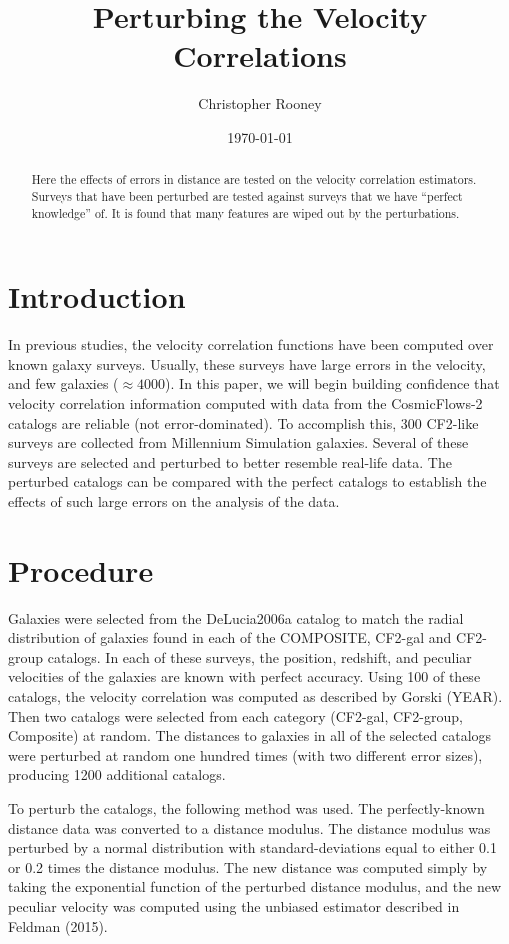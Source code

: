 \documentclass[letterpaper]{article}
\begin{document}
\author{Christopher Rooney}
\date{\today}
\title{Perturbing the Velocity Correlations}
\maketitle

\begin{abstract}
Here the effects of errors in distance are tested on the velocity correlation estimators. Surveys that have been perturbed are tested against surveys that we have ``perfect knowledge'' of. It is found that many features are wiped out by the perturbations.
\end{abstract}

\section{Introduction}
In previous studies, the velocity correlation functions have been computed over known galaxy surveys. Usually, these surveys have large errors in the velocity, and few galaxies ($\approx 4000$). In this paper, we will begin building confidence that velocity correlation information computed with data from the CosmicFlows-2 catalogs are reliable (not error-dominated). To accomplish this, 300 CF2-like surveys are collected from Millennium Simulation galaxies. Several of these surveys are selected and perturbed to better resemble real-life data. The perturbed catalogs can be compared with the perfect catalogs to establish the effects of such large errors on the analysis of the data.

\section{Procedure}
Galaxies were selected from the DeLucia2006a catalog to match the radial distribution of galaxies found in each of the COMPOSITE, CF2-gal and CF2-group catalogs. In each of these surveys, the position, redshift, and peculiar velocities of the galaxies are known with perfect accuracy. Using 100 of these catalogs, the velocity correlation was computed as described by Gorski (YEAR). Then two catalogs were selected from each category (CF2-gal, CF2-group, Composite) at random. The distances to galaxies in all of the selected catalogs were perturbed at random one hundred times (with two different error sizes), producing 1200 additional catalogs. 

To perturb the catalogs, the following method was used. The perfectly-known distance data was converted to a distance modulus. The distance modulus was perturbed by a normal distribution with standard-deviations equal to either 0.1 or 0.2 times the distance modulus. The new distance was computed simply by taking the exponential function of the perturbed distance modulus, and the new peculiar velocity was computed using the unbiased estimator described in Feldman (2015).
\end{document}

